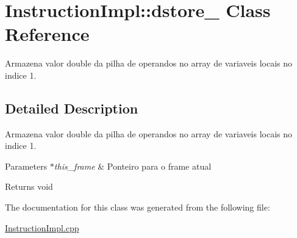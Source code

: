 \hypertarget{class_instruction_impl_1_1dstore__1}{}\section{Instruction\+Impl\+:\+:dstore\+\_ Class Reference}
\label{class_instruction_impl_1_1dstore__1}


Armazena valor double da pilha de operandos no array de variaveis locais no indice 1.  




\subsection{Detailed Description}
Armazena valor double da pilha de operandos no array de variaveis locais no indice 1. 


\begin{DoxyParams}{Parameters}
{\em $\ast$this\+\_\+frame} & Ponteiro para o frame atual \\
\hline
\end{DoxyParams}
\begin{DoxyReturn}{Returns}
void 
\end{DoxyReturn}


The documentation for this class was generated from the following file\+:\begin{DoxyCompactItemize}
\item 
\hyperlink{_instruction_impl_8cpp}{Instruction\+Impl.\+cpp}\end{DoxyCompactItemize}
